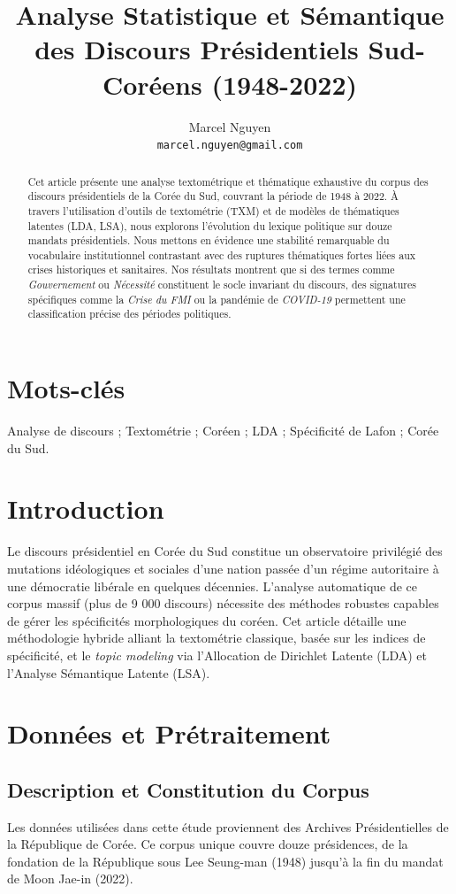 \documentclass[11pt]{article}
\title{Analyse Statistique et Sémantique des Discours Présidentiels Sud-Coréens (1948-2022)}
\author{
Marcel Nguyen \\
\texttt{marcel.nguyen@gmail.com} \\
}
\begin{document}
\maketitle

\begin{abstract}
Cet article présente une analyse textométrique et thématique exhaustive du corpus des discours présidentiels de la Corée du Sud, couvrant la période de 1948 à 2022. À travers l'utilisation d'outils de textométrie (TXM) et de modèles de thématiques latentes (LDA, LSA), nous explorons l'évolution du lexique politique sur douze mandats présidentiels. Nous mettons en évidence une stabilité remarquable du vocabulaire institutionnel contrastant avec des ruptures thématiques fortes liées aux crises historiques et sanitaires. Nos résultats montrent que si des termes comme \textit{Gouvernement} ou \textit{Nécessité} constituent le socle invariant du discours, des signatures spécifiques comme la \textit{Crise du FMI} ou la pandémie de \textit{COVID-19} permettent une classification précise des périodes politiques.
\end{abstract}

\section*{Mots-clés}
Analyse de discours ; Textométrie ; Coréen ; LDA ; Spécificité de Lafon ; Corée du Sud.

\section{Introduction}
Le discours présidentiel en Corée du Sud constitue un observatoire privilégié des mutations idéologiques et sociales d'une nation passée d'un régime autoritaire à une démocratie libérale en quelques décennies. L'analyse automatique de ce corpus massif (plus de 9 000 discours) nécessite des méthodes robustes capables de gérer les spécificités morphologiques du coréen. Cet article détaille une méthodologie hybride alliant la textométrie classique, basée sur les indices de spécificité, et le \textit{topic modeling} via l'Allocation de Dirichlet Latente (LDA) et l'Analyse Sémantique Latente (LSA).

\section{Données et Prétraitement}
\subsection{Description et Constitution du Corpus}
Les données utilisées dans cette étude proviennent des Archives Présidentielles de la République de Corée. Ce corpus unique couvre douze présidences, de la fondation de la République sous Lee Seung-man (1948) jusqu'à la fin du mandat de Moon Jae-in (2022). 
\end{document}
